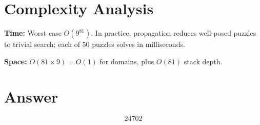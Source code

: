 \documentclass[12pt]{article}
\begin{document}
\section{Complexity Analysis}

\textbf{Time:} Worst case $O(9^{81})$. In practice, propagation reduces well-posed puzzles to trivial search; each of 50 puzzles solves in milliseconds.

\textbf{Space:} $O(81 \times 9) = O(1)$ for domains, plus $O(81)$ stack depth.

\section{Answer}

\[
\boxed{24702}
\]
\end{document}

